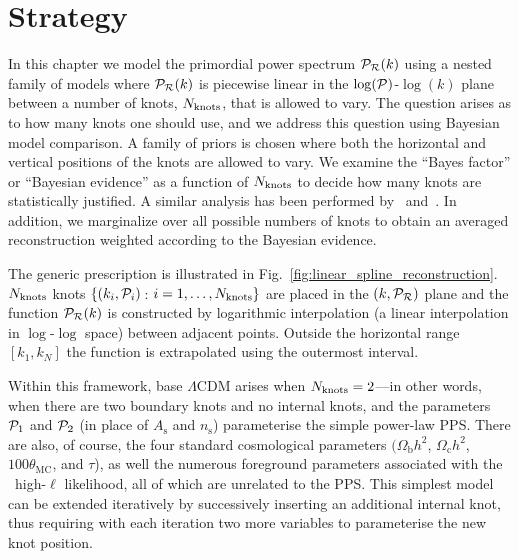 \section{Strategy}
In this chapter we model the primordial power spectrum \(\mathcal{P}_{\mathcal{R}}(k)\) using a nested family of models where \(\mathcal{P}_{\mathcal{R}}(k)\) is piecewise linear in the \(\log (\mathcal{P})\)-\(\log (k)\) plane between a number of knots, \(\Nknots\), that is allowed to vary. The question arises as to how many knots one should use, and we address this question using Bayesian model comparison.  A family of priors is chosen where both the horizontal and vertical positions of the knots are allowed to vary. We examine the ``Bayes factor'' or ``Bayesian evidence'' as a function of \(\Nknots\) to decide how many knots are statistically justified.  A similar analysis has been performed by~\cite{vazquez_knots} and~\cite{knottedsky1}.  In addition, we marginalize over all possible numbers of knots to obtain an averaged reconstruction weighted according to the Bayesian evidence.

The generic prescription is illustrated in Fig.~\ref{fig:linear_spline_reconstruction}. \(\Nknots\) knots \(\{(k_i,\mathcal{P}_{i})\,\): \(i=1,\ldots,N_\mathrm{knots}\}\) are placed in the \((k,\mathcal{P}_{\mathcal{R}})\) plane and the function \(\mathcal{P}_{\mathcal{R}}(k)\) is constructed by logarithmic interpolation (a linear interpolation in \(\log\)-\(\log\) space) between adjacent points.  Outside the horizontal range \([k_1,k_N]\) the function is extrapolated using the outermost interval.

Within this framework, base \(\Lambda\)CDM arises when \({N_\mathrm{knots}=2}\)---in other words, when there are two boundary knots and no internal knots, and the parameters \(\mathcal{P}_{1}\) and \(\mathcal{P}_{2}\) (in place of \(A_\mathrm{s}\) and \(n_\mathrm{s}\)) parameterise the simple power-law PPS\@. There are also, of course, the four standard cosmological parameters \((\Omega_{\mathrm{b}} h^2\), \(\Omega_{\mathrm{c}} h^2\), \(100\theta_{\mathrm{MC}}\), and \(\tau\)), as well the numerous foreground parameters associated with the \Planck\ high-\(\ell\) likelihood, all of which are unrelated to the PPS\@.  This simplest model can be extended iteratively by successively inserting an additional internal knot, thus requiring with each iteration two more variables to parameterise the new knot position.


\begin{table}[tp]
  \centering
  
  \caption{%
    Prior for moveable knot positions.  The \(\PR\) positions are distributed in a log-uniform manner across a wide range.  The \(k\) positions are also log-uniformly distributed across the entire range needed by \CosmoMC{} and are sorted so that \({k_1<\cdots<k_{\Nknots}}\).  When we marginalize over the number of knots, \(\Nknots\), we assume a uniform prior between 2 and 10. }\label{tab:P_k_priors} 
\end{table}

